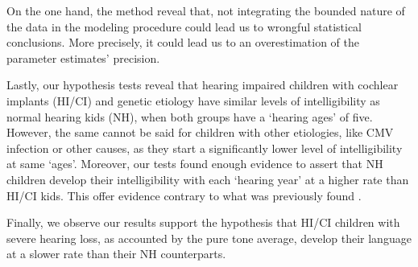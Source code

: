 On the one hand, the method reveal that, not integrating the bounded nature of the data in the modeling procedure could lead us to wrongful statistical conclusions. More precisely, it could lead us to an overestimation of the parameter estimates' precision.

Lastly, our hypothesis tests reveal that hearing impaired children with cochlear implants (HI/CI) and genetic etiology have similar levels of intelligibility as normal hearing kids (NH), when both groups have a `hearing ages' of five. However, the same cannot be said for children with other etiologies, like CMV infection or other causes, as they start a significantly lower level of intelligibility at same `ages'. Moreover, our tests found enough evidence to assert that NH children develop their intelligibility with each `hearing year' at a higher rate than HI/CI kids. This offer evidence contrary to what was previously found \cite{Boonen_et_al_2021}.

Finally, we observe our results support the hypothesis that HI/CI children with severe hearing loss, as accounted by the pure tone average, develop their language at a slower rate than their NH counterparts.
%
%
